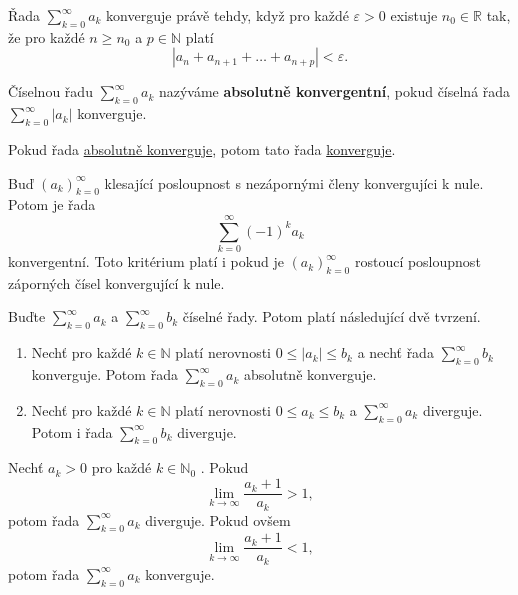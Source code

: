  Řada $\sum_{k=0}^{\infty} a_k$ konverguje právě tehdy, když pro každé $\varepsilon >0$ existuje $n_0\in\mathbb{R}$ tak, že pro každé $n \geq n_0$ a $p\in\mathbb{N}$ platí
$$
	|a_n+a_{n+1}+\dots+a_{n+p}|<\varepsilon.
$$

 \label{def:abs_konv} Číselnou řadu $\sum_{k=0}^{\infty} a_k$ nazýváme \textbf{absolutně konvergentní}, pokud číselná řada $\sum_{k=0}^{\infty} |a_k|$ konverguje.

\theorem Pokud řada \hyperref[def:abs_konv]{absolutně konverguje}, potom tato řada \hyperref[def:rada]{konverguje}.

 Buď $(a_k)_{k=0}^{\infty}$ klesající posloupnost s nezápornými členy konvergujíci k nule. Potom je řada
$$
	\sum_{k=0}^{\infty}(-1)^k a_k
$$
konvergentní. Toto kritérium platí i pokud je $(a_k)_{k=0}^{\infty}$ rostoucí posloupnost záporných čísel konvergující k nule.

 Buďte $\sum_{k=0}^{\infty} a_k$ a $\sum_{k=0}^{\infty} b_k$ číselné řady. Potom platí následující dvě tvrzení.
\vspace{-5pt}
\begin{enumerate}
	\item Nechť pro každé $k\in\mathbb{N}$ platí nerovnosti $0\leq |a_k|\leq b_k$ a nechť řada $\sum_{k=0}^{\infty} b_k$ konverguje. Potom řada $\sum_{k=0}^{\infty} a_k$ absolutně konverguje.
	\item Nechť pro každé $k\in\mathbb{N}$ platí nerovnosti $0\leq a_k\leq b_k$ a $\sum_{k=0}^{\infty} a_k$ diverguje. Potom i řada $\sum_{k=0}^{\infty} b_k$ diverguje.
\end{enumerate}
\vspace{-5pt}

 Nechť $a_k > 0$ pro každé $k \in\mathbb{N}_0$ . Pokud
$$
	\lim_{k\rightarrow\infty}\frac{a_k+1}{a_k}>1,
$$
potom řada $\sum_{k=0}^{\infty} a_k$ diverguje. Pokud ovšem
$$
	\lim_{k\rightarrow\infty}\frac{a_k+1}{a_k}<1,
$$
potom řada $\sum_{k=0}^{\infty} a_k$ konverguje.
